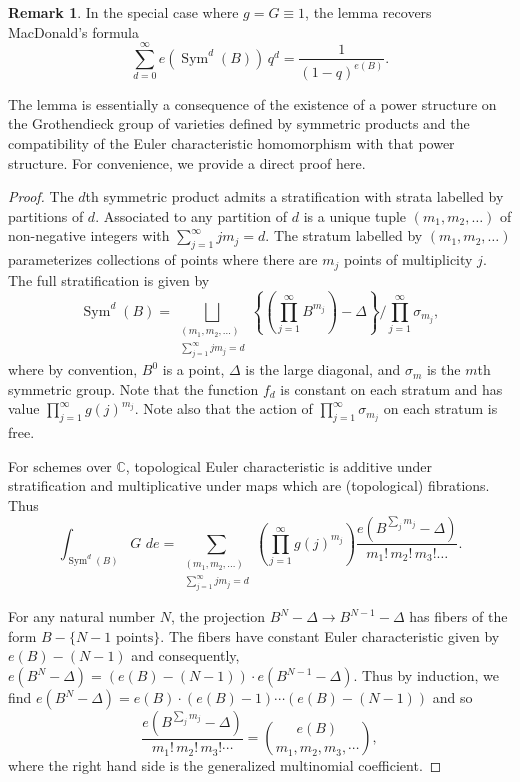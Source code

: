 \documentclass[12pt]{amsart}
\theoremstyle{definition}
\newtheorem{remark}[theorem]{Remark}
\newcommand{\CC} {\mathbb{C}}          %
\newcommand{\Sym}{\operatorname{Sym}}
\begin{document}
\begin{remark} \label{MacD}
In the special case where $g=G\equiv  1$, the lemma recovers
MacDonald's formula $$\sum _{d=0}^{\infty }e (\Sym ^{d} (B)) \, q^{d} =
\frac{1}{(1-q)^{e (B)}}.$$ 

The lemma is essentially a consequence of the existence of a power
structure on the Grothendieck group of varieties defined by
symmetric products and the compatibility of the Euler characteristic
homomorphism with that power structure. For convenience, we provide a
direct proof here.
\end{remark}
\begin{proof}
The $d$th symmetric product admits a stratification with strata
labelled by partitions of $d$. Associated to any partition of $d$ is a
unique tuple $(m_{1},m_{2},\dots )$ of non-negative integers with
$\sum _{j=1}^{\infty }j m_{j}=d$. The stratum labelled by
$(m_{1},m_{2},\dots )$ parameterizes collections of points where there
are $m_{j}$ points of multiplicity $j$. The full stratification is
given by
\[
\Sym ^{d} (B) = \bigsqcup_{\begin{smallmatrix} (m_{1},m_{2},\dots )\\
\sum _{j=1}^{\infty }j m_{j}=d  \end{smallmatrix}} \left\{\left(\prod _{j=1}^{\infty }B^{m_{j}} \right) -\Delta  \right\}/ \prod _{j=1}^{\infty }\sigma _{m_{j}}, 
\]
where by convention, $B^{0}$ is a point, $\Delta $ is the large
diagonal, and $\sigma _{m}$ is the $m$th symmetric group. Note that
the function $f_{d}$ is constant on each stratum and has value $\prod
_{j=1}^{\infty }g (j)^{m_{j}}$. Note also that the action of $\prod
_{j=1}^{\infty }\sigma _{m_{j}}$ on each stratum is free. 

For schemes over $\CC $, topological Euler characteristic is additive
under stratification and multiplicative under maps which are
(topological) fibrations. Thus
\[
\int _{\Sym ^{d} (B)} G\,\, de = \sum _{\begin{smallmatrix}(m_{1},m_{2},\dots )\\
\sum _{j=1}^{\infty }j m_{j}=d   \end{smallmatrix}} \left(\prod _{j=1}^{\infty } g (j)^{m_{j}} \right) \frac{e (B^{\sum _{j}m_{j}}-\Delta )}{m_{1}!\, m_{2}!\, m_{3}!\dots }.
\]

For any natural number $N$, the projection $B^{N}-\Delta \to
B^{N-1}-\Delta $ has fibers of the form $B-\{N-1\text{ points}
\}$. The fibers have constant Euler characteristic given by $e (B)-
(N-1)$ and consequently, $e (B^{N}-\Delta )= (e (B)- (N-1))\cdot e
(B^{N-1}-\Delta )$. Thus by induction, we find $e (B^{N}-\Delta ) = e
(B)\cdot (e (B)-1)\cdots (e (B)- (N-1))$ and so 
\[
\frac{e (B^{\sum _{j}m_{j}}-\Delta )}{m_{1}!\,m_{2}!\,m_{3}!\cdots } = \binom{e (B)}{m_{1},m_{2},m_{3},\cdots },
\]
where the right hand side is the generalized multinomial coefficient.


\end{proof}
\end{document}
